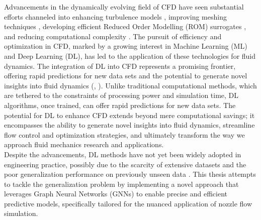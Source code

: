 Advancements in the dynamically evolving field of CFD have seen substantial efforts channeled into enhancing turbulence models \cite{pope2000turbulent}, improving meshing techniques \cite{thompson1998automatic}, developing efficient Reduced Order Modelling (ROM) surrogates \cite{benner2015survey}, and reducing computational complexity \cite{schmid2010dynamic}. The pursuit of efficiency and optimization in CFD, marked by a growing interest in Machine Learning (ML) and Deep Learning (DL), has led to the application of these technologies for fluid dynamics. The integration of DL into CFD represents a promising frontier, offering rapid predictions for new data sets and the potential to generate novel insights into fluid dynamics (\cite{kutz2017deep}, \cite{raissi2019physics}). Unlike traditional computational methods, which are tethered to the constraints of processing power and simulation time, DL algorithms, once trained, can offer rapid predictions for new data sets. The potential for DL to enhance CFD extends beyond mere computational savings; it encompasses the ability to generate novel insights into fluid dynamics, streamline flow control and optimization strategies, and ultimately transform the way we approach fluid mechanics research and applications. \\ 
Despite the advancements, DL methods have not yet been widely adopted in engineering practice, possibly due to the scarcity of extensive datasets and the poor generalization performance on previously unseen data \cite{brenner2019perspective}. This thesis attempts to tackle the generalization problem by implementing a novel approach that leverages Graph Neural Networks (GNNs) to enable precise and efficient predictive models, specifically tailored for the nuanced application of nozzle flow simulation.

